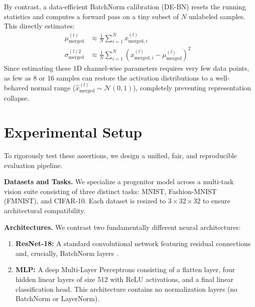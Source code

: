 \documentclass{article}
\begin{document}
By contrast, a data-efficient BatchNorm calibration (DE-BN) resets the running statistics and computes a forward pass on a tiny subset of $N$ unlabeled samples. This directly estimates:
\begin{align}
\mu_{\text{merged}}^{(l)} &\approx \frac{1}{N} \sum_{i=1}^N x_{\text{merged}, i}^{(l)} \\
\sigma_{\text{merged}}^{(l)2} &\approx \frac{1}{N} \sum_{i=1}^N \left(x_{\text{merged}, i}^{(l)} - \mu_{\text{merged}}^{(l)}\right)^2
\end{align}
Since estimating these 1D channel-wise parameters requires very few data points, as few as 8 or 16 samples can restore the activation distributions to a well-behaved normal range ($\hat{x}_{\text{merged}}^{(l)} \sim \mathcal{N}(0, 1)$), completely preventing representation collapse.

\section{Experimental Setup}
\label{sec:experiments}

To rigorously test these assertions, we design a unified, fair, and reproducible evaluation pipeline.

\textbf{Datasets and Tasks.} We specialize a progenitor model across a multi-task vision suite consisting of three distinct tasks: MNIST, Fashion-MNIST (FMNIST), and CIFAR-10. Each dataset is resized to $3 \times 32 \times 32$ to ensure architectural compatibility.

\textbf{Architectures.} We contrast two fundamentally different neural architectures:
\begin{enumerate}
    \item \textbf{ResNet-18:} A standard convolutional network featuring residual connections and, crucially, BatchNorm layers \cite{he2016deep}.
    \item \textbf{MLP:} A deep Multi-Layer Perceptrons consisting of a flatten layer, four hidden linear layers of size 512 with ReLU activations, and a final linear classification head. This architecture contains no normalization layers (no BatchNorm or LayerNorm).
\end{enumerate}
\end{document}
